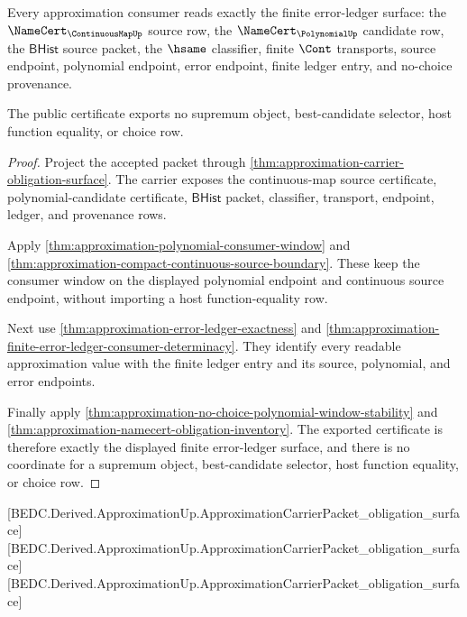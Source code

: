 \begin{theorem}
\label{thm:approximation-public-certificate-export}
Every approximation consumer reads exactly the finite error-ledger surface:
the $\NameCert_{\ContinuousMapUp}$ source row, the
$\NameCert_{\PolynomialUp}$ candidate row, the $\mathsf{BHist}$ source packet,
the $\hsame$ classifier, finite $\Cont$ transports, source endpoint,
polynomial endpoint, error endpoint, finite ledger entry, and no-choice
provenance.

The public certificate exports no supremum object, best-candidate selector,
host function equality, or choice row.
\end{theorem}
\begin{proof}
Project the accepted packet through
\autoref{thm:approximation-carrier-obligation-surface}. The carrier exposes the
continuous-map source certificate, polynomial-candidate certificate,
$\mathsf{BHist}$ packet, classifier, transport, endpoint, ledger, and
provenance rows.

Apply \autoref{thm:approximation-polynomial-consumer-window} and
\autoref{thm:approximation-compact-continuous-source-boundary}. These keep the
consumer window on the displayed polynomial endpoint and continuous source
endpoint, without importing a host function-equality row.

Next use \autoref{thm:approximation-error-ledger-exactness} and
\autoref{thm:approximation-finite-error-ledger-consumer-determinacy}. They
identify every readable approximation value with the finite ledger entry and
its source, polynomial, and error endpoints.

Finally apply
\autoref{thm:approximation-no-choice-polynomial-window-stability} and
\autoref{thm:approximation-namecert-obligation-inventory}. The exported
certificate is therefore exactly the displayed finite error-ledger surface, and
there is no coordinate for a supremum object, best-candidate selector, host
function equality, or choice row.
\end{proof}

[BEDC.Derived.ApproximationUp.ApproximationCarrierPacket\_obligation\_surface]
[BEDC.Derived.ApproximationUp.ApproximationCarrierPacket\_obligation\_surface]
[BEDC.Derived.ApproximationUp.ApproximationCarrierPacket\_obligation\_surface]

